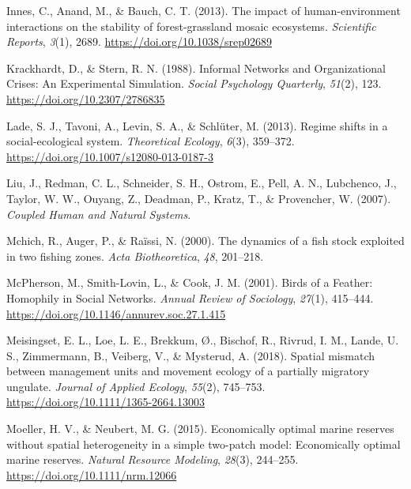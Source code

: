 \documentclass[
  12pt,
]{article}
\newlength{\cslhangindent}
\newenvironment{CSLReferences}[2] %
 {\begin{list}{}{%
  \setlength{\itemindent}{0pt}
  \setlength{\leftmargin}{0pt}
  \setlength{\parsep}{0pt}
  \ifodd #1
   \setlength{\leftmargin}{\cslhangindent}
   \setlength{\itemindent}{-1\cslhangindent}
  \fi
  \setlength{\itemsep}{#2\baselineskip}}}
 {\end{list}}
\begin{document}
\begin{CSLReferences}{1}{2}
Innes, C., Anand, M., \& Bauch, C. T. (2013). The impact of human-environment interactions on the stability of forest-grassland mosaic ecosystems. \emph{Scientific Reports}, \emph{3}(1), 2689. \url{https://doi.org/10.1038/srep02689}

Krackhardt, D., \& Stern, R. N. (1988). Informal {Networks} and {Organizational Crises}: {An Experimental Simulation}. \emph{Social Psychology Quarterly}, \emph{51}(2), 123. \url{https://doi.org/10.2307/2786835}

Lade, S. J., Tavoni, A., Levin, S. A., \& Schlüter, M. (2013). Regime shifts in a social-ecological system. \emph{Theoretical Ecology}, \emph{6}(3), 359--372. \url{https://doi.org/10.1007/s12080-013-0187-3}

Liu, J., Redman, C. L., Schneider, S. H., Ostrom, E., Pell, A. N., Lubchenco, J., Taylor, W. W., Ouyang, Z., Deadman, P., Kratz, T., \& Provencher, W. (2007). \emph{Coupled {Human} and {Natural Systems}}.

Mchich, R., Auger, P., \& Raïssi, N. (2000). The dynamics of a fish stock exploited in two fishing zones. \emph{Acta Biotheoretica}, \emph{48}, 201--218.

McPherson, M., Smith-Lovin, L., \& Cook, J. M. (2001). Birds of a {Feather}: {Homophily} in {Social Networks}. \emph{Annual Review of Sociology}, \emph{27}(1), 415--444. \url{https://doi.org/10.1146/annurev.soc.27.1.415}

Meisingset, E. L., Loe, L. E., Brekkum, Ø., Bischof, R., Rivrud, I. M., Lande, U. S., Zimmermann, B., Veiberg, V., \& Mysterud, A. (2018). Spatial mismatch between management units and movement ecology of a partially migratory ungulate. \emph{Journal of Applied Ecology}, \emph{55}(2), 745--753. \url{https://doi.org/10.1111/1365-2664.13003}

Moeller, H. V., \& Neubert, M. G. (2015). Economically optimal marine reserves without spatial heterogeneity in a simple two-patch model: {Economically} optimal marine reserves. \emph{Natural Resource Modeling}, \emph{28}(3), 244--255. \url{https://doi.org/10.1111/nrm.12066}


\end{CSLReferences}
\end{document}
